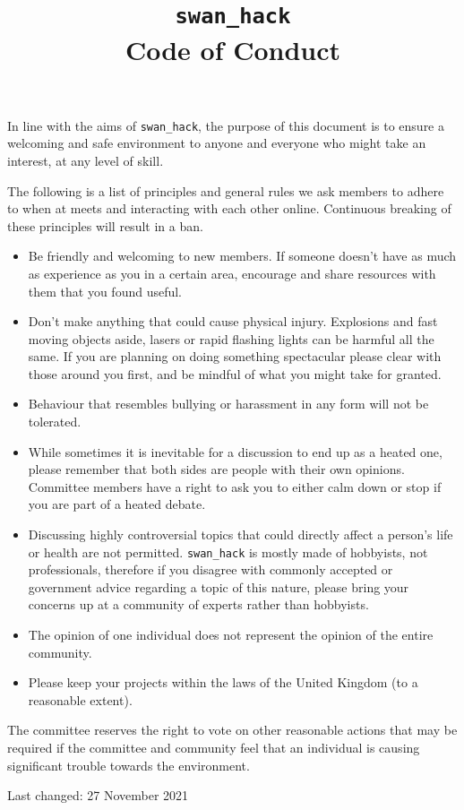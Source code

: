 \documentclass[12pt]{extarticle}
\title{\vspace{-2cm}\texttt{swan\_hack} \\ {Code of Conduct}\vspace{-3cm}}
\date{}
\begin{document}
	\maketitle
	In line with the aims of \texttt{swan\_hack}, the purpose of this document is to ensure a welcoming and safe environment to anyone and everyone who might take an interest, at any level of skill. 
	
	The following is a list of principles and general rules we ask members to adhere to when at meets and interacting with each other online. Continuous breaking of these principles will result in a ban.
	
	\begin{itemize}
		\item Be friendly and welcoming to new members. If someone doesn't have as much as experience as you in a certain area, encourage and share resources with them that you found useful.
		\item Don't make anything that could cause physical injury. Explosions and fast moving objects aside, lasers or rapid flashing lights can be harmful all the same. If you are planning on doing something spectacular please clear with those around you first, and be mindful of what you might take for granted.
		\item Behaviour that resembles bullying or harassment in any form will not be tolerated.
		\item While sometimes it is inevitable for a discussion to end up as a heated one, please remember that both sides are people with their own opinions. Committee members have a right to ask you to either calm down or stop if you are part of a heated debate.
		\item Discussing highly controversial topics that could directly affect a person's life or health are not permitted. \texttt{swan\_hack} is mostly made of hobbyists, not professionals, therefore if you disagree with commonly accepted or government advice regarding a topic of this nature, please bring your concerns up at a community of experts rather than hobbyists. 
		\item The opinion of one individual does not represent the opinion of the entire community.
		\item Please keep your projects within the laws of the United Kingdom (to a reasonable extent).
	\end{itemize}

	The committee reserves the right to vote on other reasonable actions that may be required if the committee and community feel that an individual is causing significant trouble towards the environment.
	
	\footnotesize Last changed: 27 November 2021 
\end{document}
